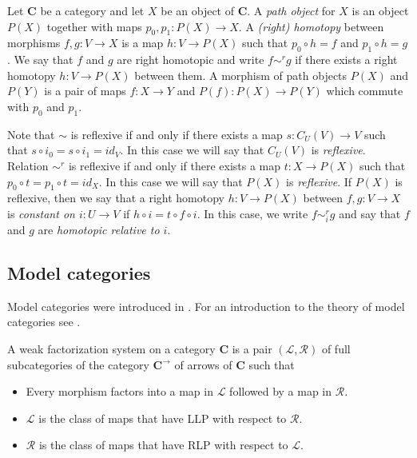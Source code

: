 \documentclass{tac}
\theoremstyle{definition}
\newcommand{\cat}[1]{\mathbf{#1}}
\newcommand{\C}{\cat{C}}
\newcommand{\cyli}{i}
\begin{document}
Let $\C$ be a category and let $X$ be an object of $\C$.
A \emph{path object} for $X$ is an object $P(X)$ together with maps $p_0,p_1 : P(X) \to X$.
A \emph{(right) homotopy} between morphisms $f,g : V \to X$ is a map
$h : V \to P(X)$ such that $p_0 \circ h = f$ and $p_1 \circ h = g$.
We say that $f$ and $g$ are right homotopic and write $f \sim^r g$
if there exists a right homotopy $h : V \to P(X)$ between them.
A morphism of path objects $P(X)$ and $P(Y)$ is a pair of maps $f : X \to Y$ and $P(f) : P(X) \to P(Y)$ which commute with $p_0$ and $p_1$.

Note that $\sim$ is reflexive if and only if there exists a map $s : C_U(V) \to V$ such that $s \circ \cyli_0 = s \circ \cyli_1 = id_V$.
In this case we will say that $C_U(V)$ is \emph{reflexive}.
Relation $\sim^r$ is reflexive if and only if there exists a map $t : X \to P(X)$ such that $p_0 \circ t = p_1 \circ t = id_X$.
In this case we will say that $P(X)$ is \emph{reflexive}.
If $P(X)$ is reflexive, then we say that a right homotopy $h : V \to P(X)$ between $f,g : V \to X$
is \emph{constant on $i : U \to V$} if $h \circ i = t \circ f \circ i$.
In this case, we write $f \sim^r_i g$ and say that $f$ and $g$ are \emph{homotopic relative to $i$}.

\subsection{Model categories}

Model categories were introduced in \cite{quillen}.
For an introduction to the theory of model categories see \cite{hirschhorn,hovey}.

\begin{defn} A weak factorization system on a category $\C$ is a pair $(\mathcal{L},\mathcal{R})$
of full subcategories of the category $\C^\to$ of arrows of $\C$ such that
\begin{itemize}
\item Every morphism factors into a map in $\mathcal{L}$ followed by a map in $\mathcal{R}$.
\item $\mathcal{L}$ is the class of maps that have LLP with respect to $\mathcal{R}$.
\item $\mathcal{R}$ is the class of maps that have RLP with respect to $\mathcal{L}$.
\end{itemize}
\end{defn}
\end{document}
